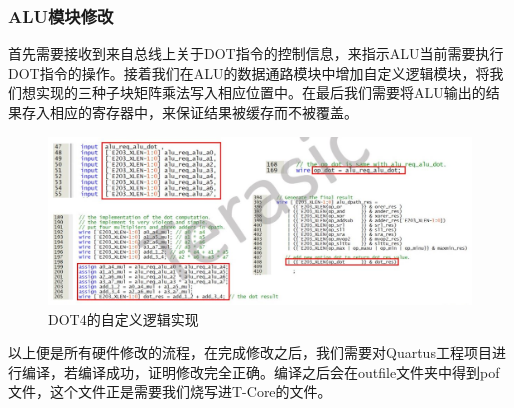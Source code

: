 \documentclass[a4paper, 14pt, oneside]{book} %
\numberwithin{equation}{subsection}
\begin{document}
	\subsubsection{ALU模块修改}
	首先需要接收到来自总线上关于DOT指令的控制信息，来指示ALU当前需要执行DOT指令的操作。接着我们在ALU的数据通路模块中增加自定义逻辑模块，将我们想实现的三种子块矩阵乘法写入相应位置中。在最后我们需要将ALU输出的结果存入相应的寄存器中，来保证结果被缓存而不被覆盖。
	\begin{figure}[H]
		\centering
		\includegraphics[scale=0.7]{img/alu.jpg}
		\caption{DOT4的自定义逻辑实现}
	\end{figure}

	以上便是所有硬件修改的流程，在完成修改之后，我们需要对Quartus工程项目进行编译，若编译成功，证明修改完全正确。编译之后会在outfile文件夹中得到pof文件，这个文件正是需要我们烧写进T-Core的文件。
	
\end{document}
